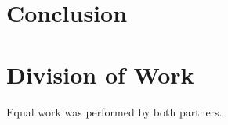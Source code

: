 \documentclass[11pt]{article}
\begin{document}
\section{Conclusion}

\section{Division of Work}
Equal work was performed by both partners.




\printbibliography
\end{document}
